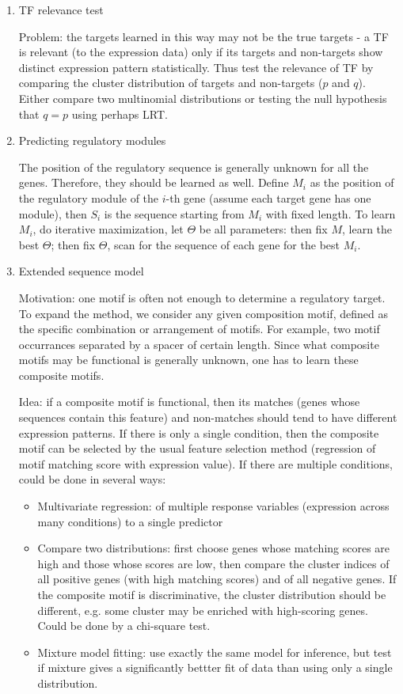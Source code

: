 \documentclass[11pt]{article}
\begin{document}
\begin{enumerate}
\begin{enumerate}
\item{TF relevance test}

Problem: the targets learned in this way may not be the true targets - a TF is relevant (to the expression data) only if its targets and non-targets show distinct expression pattern statistically. Thus test the relevance of TF by comparing the cluster distribution of targets and non-targets ($p$ and $q$). Either compare two multinomial distributions or testing the null hypothesis that $q = p$ using perhaps LRT. 

\item{Predicting regulatory modules}

The position of the regulatory sequence is generally unknown for all the genes. Therefore, they should be learned as well. Define $M_i$ as the position of the regulatory module of the $i$-th gene (assume each target gene has one module), then $S_i$ is the sequence starting from $M_i$ with fixed length. To learn $M_i$, do iterative maximization, let $\Theta$ be all parameters: then fix $M$, learn the best $\Theta$; then fix $\Theta$, scan for the sequence of each gene for the best $M_i$. 

\item{Extended sequence model}

Motivation: one motif is often not enough to determine a regulatory target. To expand the method, we consider any given composition motif, defined as the specific combination or arrangement of motifs. For example, two motif occurrances separated by a spacer of certain length. Since what composite motifs may be functional is generally unknown, one has to learn these composite motifs. 

Idea: if a composite motif is functional, then its matches (genes whose sequences contain this feature) and non-matches should tend to have different expression patterns. If there is only a single condition, then the composite motif can be selected by the usual feature selection method (regression of motif matching score with expression value). If there are multiple conditions, could be done in several ways: 
\begin{itemize}
\item Multivariate regression: of multiple response variables (expression across many conditions) to a single predictor
\item Compare two distributions: first choose genes whose matching scores are high and those whose scores are low, then compare the cluster indices of all positive genes (with high matching scores) and of all negative genes. If the composite motif is discriminative, the cluster distribution should be different, e.g. some cluster may be enriched with high-scoring genes. Could be done by a chi-square test. 
\item Mixture model fitting: use exactly the same model for inference, but test if mixture gives a significantly bettter fit of data than using only a single distribution. 
\end{itemize}


\end{enumerate}
\end{enumerate}
\end{document}
